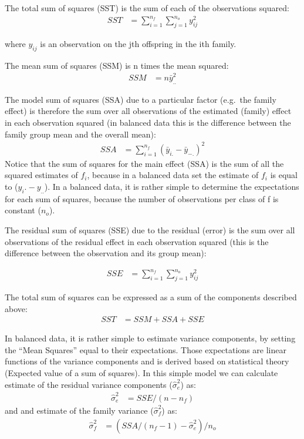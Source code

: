 \documentclass[
]{book}
\begin{document}
The total sum of squares (SST) is the sum of each of the observations squared:
\begin{align}
 SST &= \sum_{i=1}^{n_f}\sum_{j=1}^{n_o} {y}_{ij}^2
\end{align}

where \(y_{ij}\) is an observation on the jth offspring in the ith family.

The mean sum of squares (SSM) is n times the mean squared:
\begin{align}
 SSM &= n\bar{y}_{..}^2
\end{align}

The model sum of squares (SSA) due to a particular factor (e.g.~the family effect) is therefore the sum over all observations of the estimated (family) effect in each observation squared (in balanced data this
is the difference between the family group mean and the overall mean):
\begin{align}
 SSA &= \sum_{i=1}^{n_f} (\bar{y}_{i.}-\bar{y}_{-.})^2
\end{align}
Notice that the sum of squares for the main effect (SSA) is the sum of all the squared
estimates of \(f_i\), because in a balanced data set the estimate of \(f_i\) is equal to (\(y_{i}.-y_{..}\)). In a
balanced data, it is rather simple to determine the expectations for each sum of squares,
because the number of observations per class of f is constant (\(n_o\)).

The residual sum of squares (SSE) due to the residual (error) is the sum over all
observations of the residual effect in each observation squared (this is the
difference between the observation and its group mean):

\begin{align}
 SSE &= \sum_{i=1}^{n_f}\sum_{j=1}^{n_o} {y}_{ij}^2
\end{align}

The total sum of squares can be expressed as a sum of the components described above:\\
\begin{align}
 SST &= SSM + SSA + SSE
\end{align}

In balanced data, it is rather simple to estimate variance components, by setting
the ``Mean Squares'' equal to their expectations. Those expectations are linear functions
of the variance components and is derived based on statistical theory (Expected value
of a sum of squares).
In this simple model we can calculate estimate of the residual variance components (\(\hat{\sigma}^2_{e}\)) as:
\begin{align}
 \hat{\sigma}^2_{e} &= SSE/(n-n_f)
\end{align}
and and estimate of the family variance (\(\hat{\sigma}^2_{f}\)) as:
\begin{align}
 \hat{\sigma}^2_{f} &= (SSA/(n_f-1) - \hat{\sigma}^2_{e})/n_o
\end{align}
\end{document}
